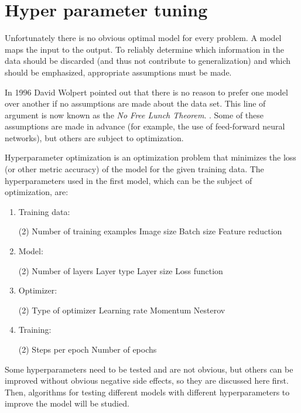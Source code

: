 \section{Hyper parameter tuning} \label{ch:hyper_parameter_tuning}

Unfortunately there is no obvious optimal model for every problem.
A model maps the input to the output.
To reliably determine which information in the data should be discarded (and thus not contribute to generalization) and which should be emphasized, appropriate assumptions must be made.

In 1996 David Wolpert pointed out that there is no reason to prefer one model over another if no assumptions are made about the data set.
This line of argument is now known as the \textit{No Free Lunch Theorem}. \cite{Wolpert1996}.
Some of these assumptions are made in advance (for example, the use of feed-forward neural networks), but others are subject to optimization.

Hyperparameter optimization is an optimization problem that minimizes the loss (or other metric accuracy) of the model for the given training data.
The hyperparameters used in the first model, which can be the subject of optimization, are:

\begin{enumerate}
    \item Training data:
    \begin{tasks}(2)
        \task Number of training examples
        \task Image size
        \task Batch size
        \task Feature reduction
    \end{tasks}
    \item Model:
    \begin{tasks}(2)
        \task Number of layers
        \task Layer type
        \task Layer size
        \task Loss function
    \end{tasks}
    \item Optimizer:
    \begin{tasks}(2)
        \task Type of optimizer
        \task Learning rate
        \task Momentum
        \task Nesterov
    \end{tasks}
    \item Training:
    \begin{tasks}(2)
        \task Steps per epoch
        \task Number of epochs
    \end{tasks}
\end{enumerate}

Some hyperparameters need to be tested and are not obvious, but others can be improved without obvious negative side effects, so they are discussed here first. Then, algorithms for testing different models with different hyperparameters to improve the model will be studied.

